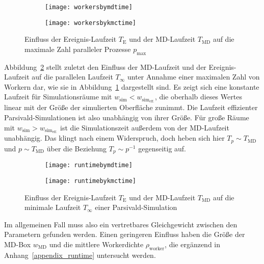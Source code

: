 \begin{figure}[tp]
  
  \captionsetup[subfigure]{singlelinecheck=false}
  \def\subfigwidth{7cm}
  \begin{subfigure}[t]{\subfigwidth}
    \texttt{[image: workersbymdtime]}
  \end{subfigure}
  \hfill
  \begin{subfigure}[t]{\subfigwidth}
    \texttt{[image: workersbykmctime]}
  \end{subfigure}

  \caption{Einfluss der Ereignis-Laufzeit $T_\text{E}$ und der MD-Laufzeit $T_\text{MD}$ auf die maximale Zahl paralleler Prozesse $p_\text{max}$}
  \label{fig:workersbytime}
  
\end{figure}

Abbildung~\ref{fig:runtimebytime} stellt zuletzt den Einfluss der MD-Laufzeit und der Ereignis-Laufzeit auf die parallelen Laufzeit $T_\infty$ unter Annahme einer maximalen Zahl von Workern dar, wie sie in Abbildung~\ref{fig:workersbytime} dargestellt sind.
Es zeigt sich eine konstante Laufzeit für Simulationsräume mit $w_\text{sim} < w_{\text{sim}_\text{eff.}}$, die oberhalb dieses Wertes linear mit der Größe der simulierten Oberfläche zunimmt.
Die Laufzeit effizienter Parsivald-Simulationen ist also unabhängig von ihrer Größe.
Für große Räume mit $w_\text{sim} > w_{\text{sim}_\text{eff.}}$ ist die Simulationszeit außerdem von der MD-Laufzeit unabhängig.
Das klingt nach einem Widerspruch, doch heben sich hier $T_p \sim T_\text{MD}$ und $p \sim T_\text{MD}$ über die Beziehung $T_p \sim p^{-1}$ gegenseitig auf.

\begin{figure}[hbp]
  
  \captionsetup[subfigure]{singlelinecheck=false}
  \def\subfigwidth{7cm}
  \begin{subfigure}[t]{\subfigwidth}
    \texttt{[image: runtimebymdtime]}
  \end{subfigure}
  \hfill
  \begin{subfigure}[t]{\subfigwidth}
    \texttt{[image: runtimebykmctime]}
  \end{subfigure}

  \caption{Einfluss der Ereignis-Laufzeit $T_\text{E}$ und der MD-Laufzeit $T_\text{MD}$ auf die minimale Laufzeit $T_\infty$ einer Parsivald-Simulation}
  \label{fig:runtimebytime}
  
\end{figure}

Im allgemeinen Fall muss also ein vertretbares Gleichgewicht zwischen den Parametern gefunden werden.
Einen geringeren Einfluss haben die Größe der MD-Box $w_\text{MD}$ und die mittlere Workerdichte $\rho_\text{worker}$, die ergänzend in Anhang~\ref{appendix_runtime} untersucht werden.
